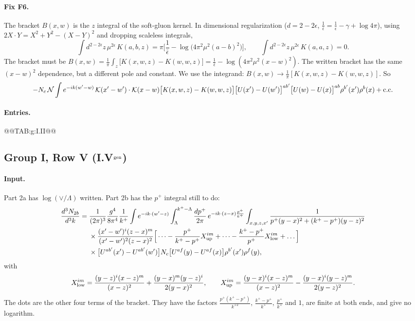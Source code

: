 \documentclass[10pt]{article}
\numberwithin{equation}{section}
\newcommand{\KK}{\mathcal K}
\newcommand{\NN}{\mathcal N}
\begin{document}
\paragraph{Fix F6.} The bracket $B(x,w)$ is the $z$ integral of the soft-gluon kernel. In dimensional regularization ($d=2-2\epsilon$, $\frac1{\bar\epsilon}=\frac1\epsilon-\gamma+\log4\pi$), using $2X\cdot Y=X^2+Y^2-(X-Y)^2$ and dropping scaleless integrals,
\begin{equation}
\int d^{2-2\epsilon}z\,\mu^{2\epsilon}\,K(a,b,z)=\pi\Big[\frac1{\bar\epsilon}-\log\big(4\pi^2\mu^2(a-b)^2\big)\Big],\qquad\int d^{2-2\epsilon}z\,\mu^{2\epsilon}\,K(a,a,z)=0 .
\label{eq:dimreg}
\end{equation}
The bracket must be $B(x,w)=\frac1\pi\int_z\big[K(x,w,z)-K(w,w,z)\big]=\frac1{\bar\epsilon}-\log(4\pi^2\mu^2(x-w)^2)$. The written bracket has the same $(x-w)^2$ dependence, but a different pole and constant. We use the integrand: $B(x,w)\to\frac1\pi[K(x,w,z)-K(w,w,z)]$. So
\begin{equation}
-N_c\,\NN\int e^{-ik(w'-w)}\,\KK(x'-w')\cdot\KK(x-w)\big[K(x,w,z)-K(w,w,z)\big]\big[U(x')-U(w')\big]^{ab'}\big[U(w)-U(x)\big]^{ab}\rho^{b'}(x')\rho^b(x)+{\rm c.c.}
\end{equation}
\paragraph{Entries.}
@@TAB:g:I.II@@

\subsection{Group I, Row V \texorpdfstring{(I.V$^{\rm gen}$)}{}}\label{src:g:I.V}
\paragraph{Input.} Part 2a has $\log(\vee/\Lambda)$ written. Part 2b has the $p^+$ integral still to do:
\begin{align}
\frac{d^3N_{2b}}{d^3k}={}&\frac{1}{(2\pi)^3}\frac{g^4}{8\pi^4}\frac1{k^+}\int e^{-ik\cdot(w'-z)}\int_\Lambda^{k^+-\Lambda}\frac{dp^+}{2\pi}\,e^{-ik\cdot(z-x)\frac{p^+}{k^+}}\int_{x,y,z,x'}\frac{1}{p^+(y-x)^2+(k^+-p^+)(y-z)^2}\notag\\
&\times\frac{(x'-w')^i(z-x)^m}{(x'-w')^2(z-x)^2}\Big[\dots-\frac{p^+}{k^+-p^+}X^{im}_{\rm up}+\dots-\frac{k^+-p^+}{p^+}X^{im}_{\rm low}+\dots\Big]\notag\\
&\times\big[U^{ab'}(x')-U^{ab'}(w')\big]N_c\big[U^{af}(y)-U^{af}(x)\big]\rho^{b'}(x')\rho^f(y),
\end{align}
with
\begin{equation}
X^{im}_{\rm low}=\frac{(y-z)^i(x-z)^m}{(x-z)^2}+\frac{(y-x)^m(y-z)^i}{2(y-x)^2},\qquad X^{im}_{\rm up}=\frac{(y-x)^i(x-z)^m}{(x-z)^2}-\frac{(y-x)^i(y-z)^m}{2(y-z)^2}.
\end{equation}
The dots are the other four terms of the bracket. They have the factors $\frac{p^+(k^+-p^+)}{k^{+2}}$, $\frac{k^+-p^+}{k^+}$, $\frac{p^+}{k^+}$ and $1$, are finite at both ends, and give no logarithm.
\end{document}
